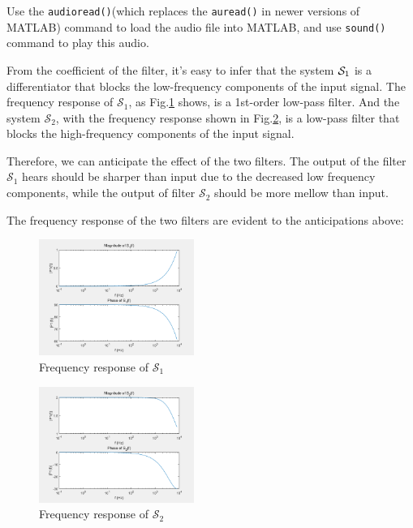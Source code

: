 \documentclass[conference]{IEEEtran}
\begin{document}
Use the \lstinline{audioread()}(which replaces the \lstinline{auread()} in newer versions of MATLAB) command to load the audio file into MATLAB, and use \lstinline{sound()} command to play this audio.

From the coefficient of the filter, it's easy to infer that the system \( \mathcal{\MakeUppercase{S}}_{1} \) is a differentiator that blocks the low-frequency components of the input signal. The frequency response of \(\mathcal{S}_{1}\), as Fig.\ref{fig:resp_s1} shows, is a 1st-order low-pass filter. And the system \( \mathcal{S}_{2} \), with the frequency response shown in Fig.\ref{fig:resp_s2}, is a low-pass filter that blocks the high-frequency components of the input signal.

Therefore, we can anticipate the effect of the two filters. The output of the filter \(\mathcal{S}_{1}\) hears should be sharper than input due to the decreased low frequency components, while the output of filter \( \mathcal{S}_{2} \) should be more mellow than input.

The frequency response of the two filters are evident to the anticipations above:

\begin{figure}[htpb]
	\begin{small}
		\begin{center}
			\includegraphics[width=0.45\textwidth]{../matlab/q25_3.png}
		\end{center}
		\caption{Frequency response of \(\mathcal{S}_{1}\)}
		\label{fig:resp_s1}
	\end{small}
\end{figure}

\begin{figure}[htpb]
	\begin{small}
		\begin{center}
			\includegraphics[width=0.45\textwidth]{../matlab/q25_4.png}
		\end{center}
		\caption{Frequency response of \(\mathcal{S}_{2}\)}
		\label{fig:resp_s2}
	\end{small}
\end{figure}
\end{document}
